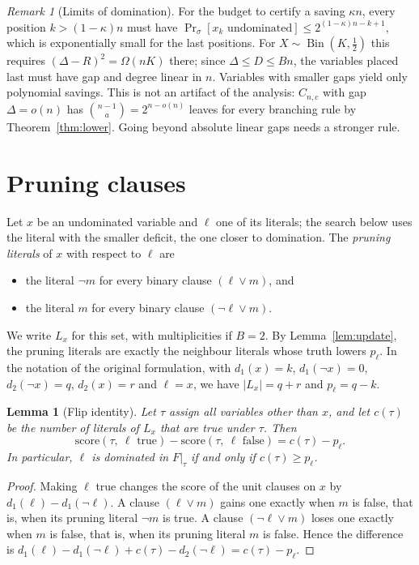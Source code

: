 \documentclass[11pt,a4paper]{article}
\newtheorem{lemma}[theorem]{Lemma}
\theoremstyle{remark}
\newtheorem{remark}[theorem]{Remark}
\begin{document}
\begin{remark}[Limits of domination]\label{rem:limits}
For the budget to certify a saving $\kappa n$, every position
$k>(1-\kappa)n$ must have $\Pr_\sigma[x_k\text{ undominated}]\le
2^{(1-\kappa)n-k+1}$, which is exponentially small for the last positions.
For $X\sim\operatorname{Bin}(K,\frac12)$ this requires $(\Delta-R)^2=\Omega(nK)$
there; since $\Delta\le D\le Bn$, the variables placed last must have gap and
degree linear in $n$. Variables with smaller gaps yield only polynomial
savings. This is not an artifact of the analysis: $C_{n,c}$ with gap
$\Delta=o(n)$ has $\binom{n-1}a=2^{n-o(n)}$ leaves for every branching rule
by Theorem~\ref{thm:lower}. Going beyond absolute linear gaps needs a
stronger rule.
\end{remark}

\section{Pruning clauses}\label{sec:pruning}

Let $x$ be an undominated variable and $\ell$ one of its literals; the search
below uses the literal with the smaller deficit, the one closer to domination.
The \emph{pruning literals} of $x$ with respect to $\ell$ are
\begin{itemize}
 \item the literal $\neg m$ for every binary clause $(\ell\lor m)$, and
 \item the literal $m$ for every binary clause $(\neg\ell\lor m)$.
\end{itemize}
We write $L_x$ for this set, with multiplicities if $B=2$. By
Lemma~\ref{lem:update}, the pruning literals are exactly the neighbour literals
whose truth lowers $p_\ell$. In the notation of the original formulation, with
$d_1(x)=k$, $d_1(\neg x)=0$, $d_2(\neg x)=q$, $d_2(x)=r$ and $\ell=x$, we have
$|L_x|=q+r$ and $p_\ell=q-k$.

\begin{lemma}[Flip identity]\label{lem:flip}
Let $\tau$ assign all variables other than $x$, and let $c(\tau)$ be the number
of literals of $L_x$ that are true under $\tau$. Then
\[
 \mathrm{score}(\tau,\ \ell\text{ true})-\mathrm{score}(\tau,\ \ell\text{ false})
 =c(\tau)-p_\ell .
\]
In particular, $\ell$ is dominated in $F|_\tau$ if and only if $c(\tau)\ge p_\ell$.
\end{lemma}

\begin{proof}
Making $\ell$ true changes the score of the unit clauses on $x$ by
$d_1(\ell)-d_1(\neg\ell)$. A clause $(\ell\lor m)$ gains one exactly when $m$ is
false, that is, when its pruning literal $\neg m$ is true. A clause
$(\neg\ell\lor m)$ loses one exactly when $m$ is false, that is, when its
pruning literal $m$ is false. Hence the difference is
$d_1(\ell)-d_1(\neg\ell)+c(\tau)-d_2(\neg\ell)=c(\tau)-p_\ell$.
\end{proof}
\end{document}
